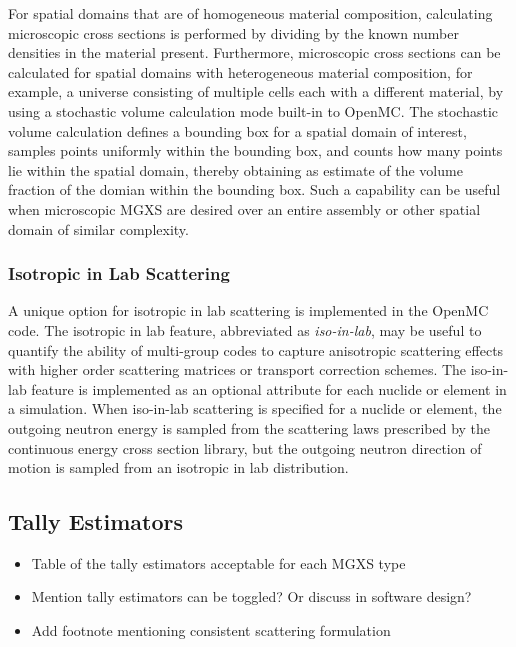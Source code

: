 For spatial domains that are of homogeneous material composition, calculating microscopic cross sections is performed by dividing by the known number densities in the material present. Furthermore, microscopic cross sections can be calculated for spatial domains with heterogeneous material composition, for example, a universe consisting of multiple cells each with a different material, by using a stochastic volume calculation mode built-in to OpenMC. The stochastic volume calculation defines a bounding box for a spatial domain of interest, samples points uniformly within the bounding box, and counts how many points lie within the spatial domain, thereby obtaining as estimate of the volume fraction of the domian within the bounding box. Such a capability can be useful when microscopic MGXS are desired over an entire assembly or other spatial domain of similar complexity.

\subsubsection{Isotropic in Lab Scattering}
\label{subsec:iso-in-lab}

A unique option for isotropic in lab scattering is implemented in the OpenMC code. The isotropic in lab feature, abbreviated as \emph{iso-in-lab}, may be useful to quantify the ability of multi-group codes to capture anisotropic scattering effects with higher order scattering matrices or transport correction schemes. The iso-in-lab feature is implemented as an optional attribute for each nuclide or element in a simulation. When iso-in-lab scattering is specified for a nuclide or element, the outgoing neutron energy is sampled from the scattering laws prescribed by the continuous energy cross section library, but the outgoing neutron direction of motion is sampled from an isotropic in lab distribution.

\subsection{Tally Estimators}
\label{subsec:tally-est}

\begin{itemize}[noitemsep]
\item Table of the tally estimators acceptable for each MGXS type
\item Mention tally estimators can be toggled? Or discuss in software design?
\item Add footnote mentioning consistent scattering formulation
\end{itemize}

